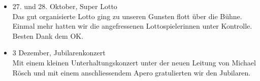 \begin{history}
\begin{itemize}
        \item[]27. und 28. Oktober, Super Lotto\\
        Das gut organisierte Lotto ging zu unseren Gunsten flott über die Bühne.
        Einmal mehr hatten wir die angefressenen Lottospielerinnen unter
        Kontrolle. Besten Dank dem OK.

        \item[]3 Dezember, Jubilarenkonzert\\
        Mit einem kleinen Unterhaltungskonzert unter der neuen Leitung von
        Michael Rösch und mit einem anschliessendem Apero gratulierten wir den
        Jubilaren.

    \end{itemize}

\end{history}
